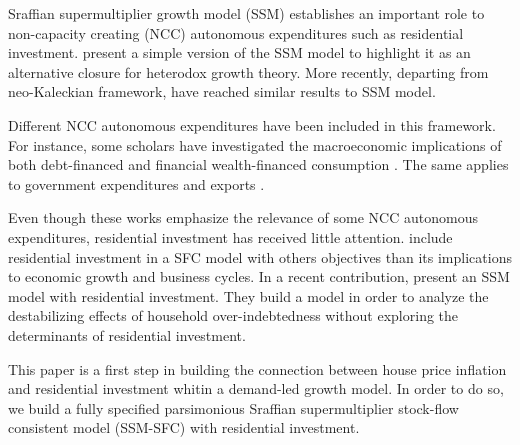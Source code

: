 \documentclass[12pt, a4]{article}
\begin{document}
Sraffian supermultiplier growth model (SSM) establishes an important role to non-capacity creating (NCC) autonomous expenditures such
as residential investment.
\textcite{serrano_long_1995,serrano_sraffian_2017} present a simple version of the SSM model to highlight it as an alternative closure for heterodox growth theory.
More recently, departing from neo-Kaleckian framework, \textcites{allain_tackling_2015}{lavoie_post-keynesian_2015}{lavoie_convergence_2016} have reached similar results to SSM model. 

Different NCC autonomous expenditures have been included in this framework. 
For instance, some scholars have investigated the macroeconomic implications of both debt-financed \cites{pariboni_autonomous_2015}{fagundes_role_2017}{mandarino-2020-worker-debt} and financial wealth-financed consumption \cite{brochier_supermultiplier_2018}.
The same applies to government expenditures \cites{allain_tackling_2015}{bougrine_autonomous_2020} and exports \cite{nah_long-run_2017}.

Even though these works emphasize the relevance of some NCC autonomous expenditures, residential investment has received little attention.
\textcites{zezza_u.s._2008}{nikolaidi_securitisation_2015} include residential investment in a SFC model with others objectives than its implications to economic growth and business cycles.
In a recent contribution, \textcite{dejuan_supermultiplier-cum-finance_2018} present an SSM model with residential investment.
They build a model in order to analyze the destabilizing effects of household over-indebtedness without exploring the determinants of residential investment.

This paper is a first step in building the connection between house price inflation and residential investment whitin a demand-led growth model.
In order to do so, we build a fully specified parsimonious Sraffian supermultiplier stock-flow consistent model (SSM-SFC) with residential investment.
\end{document}

